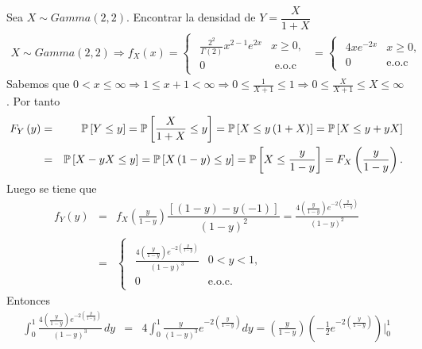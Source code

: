 \begin{Ejem}
Sea $X \sim Gamma \left(2,2 \right)$. Encontrar la densidad de $Y=\dfrac{X}{1+X}$
\begin{eqnarray*}
X \sim Gamma \left( 2,2 \right) \Rightarrow f_{X}\left( x \right)= 
\begin{cases}
\begin{array}{lc}
\frac{2^{2}}{\Gamma\left(2\right)}x^{2-1}e^{2x} & x \geq 0, \\
0 & \textrm{ e.o.c}
\end{array}
\end{cases}
=\begin{cases}
\begin{array}{lc}
4xe^{-2x} & x \geq 0, \\
0 & \textrm {e.o.c}
\end{array}
\end{cases}
\end{eqnarray*}
Sabemos que 
$0<x\leq \infty \Rightarrow 1 \leq x+1 < \infty \Rightarrow 0 \leq \frac{1}{X+1}\leq 1 \Rightarrow 0\leq\frac{X}{X+1}\leq X\leq \infty$. Por tanto
\begin{eqnarray*}
F_{Y}\left(y\right)&=&\mathbb{P}\left[Y\leq y\right]=\mathbb{P} \left[\frac{X}{1+X}\leq y\right]=\mathbb{P}\left[X\leq y\left(1+X\right)\right]= \mathbb{P}\left[X\leq y+yX\right]\\
&=&\mathbb{P}\left[X-yX\leq y\right]=\mathbb{P}\left[X\left(1-y\right)\leq y\right]=\mathbb{P}\left[X\leq \frac{y}{1-y}\right]= F_{X}\left(\dfrac{y}{1-y}\right).
\end{eqnarray*}
Luego se tiene que
\begin{eqnarray*}
f_{Y}\left(y\right)&=&f_{X}\left(\frac{y}{1-y}\right)\dfrac{\left[\left(1-y\right)-y\left(-1\right)\right]}{\left(1-y\right)^{2}}=\frac{4\left(\frac{y}{1-y}\right)e^{-2\left(\frac{y}{1-y}\right)}}{\left(1-y\right)^{2}}\\
&=&\begin{cases}
\begin{array}{cc}
\frac{4\left(\frac{y}{1-y}\right)e^{-2\left(\frac{y}{1-y}\right)}}{\left(1-y\right)^{3}} & 0<y<1, \\
0 & \textrm {e.o.c.}
\end{array}
\end{cases}
\end{eqnarray*}
Entonces
\begin{eqnarray*}
\int_{0}^{1}\frac{4\left(\frac{y}{1-y}\right)e^{-2\left(\frac{y}{1-y}\right)}}{\left(1-y\right)^{3}}\, dy &=& 4\int_{0}^{1}\frac{y}{\left(1-y\right)^3}e^{-2\left(\frac{y}{1-y}\right)}dy = \left(\frac{y}{1-y}\right)\left(-\frac{1}{2}e^{-2\left(\frac{y}{1-y}\right)}\right)\vert_{0}^{1}\\

\end{eqnarray*}
\end{Ejem}
